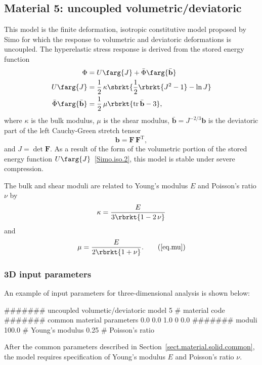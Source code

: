 \subsection{Material 5: uncoupled volumetric/deviatoric}
\label{sect.mat.SimoIso}
This model is the finite deformation, isotropic
constitutive model proposed by 
Simo \etal\cite{Simo1985} for
which the response to volumetric and deviatoric
deformations is uncoupled.
The hyperelastic stress response is derived from the
stored energy function
\begin{align}
\Phi &= U\farg{J} + \bar{\Phi}\farg{\bar{\mathbf{b}}} 
\label{Simo.iso.1}\\
U\farg{J} &= \frac{1}{2}\,\kappa 
    \sbrkt{
        \frac{1}{2} \rbrkt{J^{2}-1}-\ln J 
    } \label{Simo.iso.2}\\
\bar{\Phi}\farg{\bar{\mathbf{b}}} &=
    \frac{1}{2}\,\mu \rbrkt{\text{tr}\,\bar{\mathbf{b}} - 
    3}\label{Simo.iso.3},
\end{align}
where $\kappa$ is the bulk modulus, $\mu$ is the shear modulus,
$\bar{\mathbf{b}}=J^{-2/3}\mathbf{b}$ is the deviatoric part of the
left Cauchy-Green stretch tensor
\begin{equation}
	\mathbf{b} = \mathbf{F}\,\mathbf{F}^{\text{T}},
\end {equation}
and $J = \det \mathbf{F}$. As a result of the form of 
the volumetric portion 
of the stored energy function
$U\farg{J}$~\eqref{Simo.iso.2}, this model is 
stable under severe compression.

The bulk and shear moduli are related to Young's modulus $E$
and Poisson's ratio $\nu$ by
\begin{equation}
\label{eq.kappa}
\kappa = \frac{E}{3 \rbrkt{1 - 2\,\nu}}
\end{equation}
and
\begin{equation}
\mu = \frac{E}{2 \rbrkt{1 + \nu}}.
\tag{\ref{eq.mu}}
\end{equation}

\subsubsection{3D input parameters}
An example of input parameters for three-dimensional analysis is shown 
below:
\begin{inputfile}
####### uncoupled volumetic/deviatoric model
5     # material code
####### common material parameters
0.0    0.0    1.0
0      0.0
####### moduli
100.0 # Young's modulus
0.25  # Poisson's ratio
\end{inputfile}
After the common parameters described in 
Section~\ref{sect.material.solid.common}, the 
model requires specification of Young's modulus 
$E$ and Poisson's ratio $\nu$.

